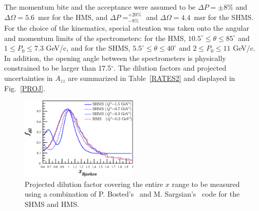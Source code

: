 The momentum bite and the acceptance were assumed to be $\Delta P = \pm 8\%$ and $\Delta\Omega = 5.6$~msr for the HMS, and $\Delta P= ^{+20\%}_{-8\%}$ 
and $\Delta\Omega =4.4$~msr for the SHMS. 
%
For the choice of the kinematics,
special attention was taken onto the angular and momentum limits of the spectrometers: for the
HMS, $10.5^{\circ} \le \theta \le 85^{\circ}$ and $1 \le P_0 \le 7.3$ GeV/c, and for the SHMS,
$5.5^{\circ} \le \theta \le 40^{\circ}$ and $2 \le P_0 \le 11$ GeV/c. In addition, the
opening angle between the spectrometers is physically constrained to be larger than 17.5$^{\circ}$.
The dilution factors and projected uncertainties in $A_{zz}$ are summarized in Table~\ref{RATES2} and displayed in Fig.~\ref{PROJ}.  

\begin{figure}
\begin{center}
\includegraphics[width=0.5\textwidth]{figs/Pzz_30_fdil_all.eps} 
\caption{\label{fdil_plot}Projected dilution factor covering the entire $x$ range to be measured using a combination of P. Bosted's~\cite{Bosted:2012qc} and M. Sargsian's~\cite{misak-convo} code for the SHMS and HMS.}
\end{center}
\end{figure}


